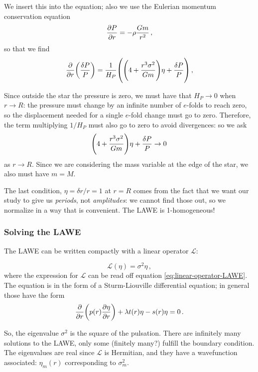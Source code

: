 \documentclass[main.tex]{subfiles}
\begin{document}
We insert this into the equation; also we use the Eulerian momentum conservation equation 
%
\begin{align}
\pdv{P}{r} = -\rho \frac{Gm}{r^2}
\,,
\end{align}
%
so that we find 
%
\begin{align}
\pdv{}{r} \qty(\frac{ \delta P}{P}) =
\frac{1}{H_P} \qty(
\qty(
4 + \frac{r^3 \sigma^2}{ Gm}
) \eta 
+ \frac{ \delta P }{P }
)
\,,
\end{align}
%

Since outside the star the pressure is zero, we must have that \(H_P \rightarrow 0\) when \(r \rightarrow R\): the pressure must change by an infinite number of \(e\)-folds to reach zero, so the displacement needed for a single \(e\)-fold change must go to zero. Therefore, the term multiplying \(1/H_P\) must also go to zero to avoid divergences: so we ask 
%
\begin{align}
\qty(4 + \frac{r^3 \sigma^2 }{Gm}) \eta + \frac{ \delta P}{P} \rightarrow 0 
\,
\end{align}
%
as \(r \rightarrow R\). Since we are considering the mass variable at the edge of the star, we also must have \(m=M\).

The last condition, \(\eta = \delta r / r = 1\) at \(r=R\) comes from the fact that we want our study to give us \emph{periods}, not \emph{amplitudes}: we cannot find those out, so we normalize in a way that is convenient. The LAWE is 1-homogeneous!

\subsubsection{Solving the LAWE}

The LAWE can be written compactly with a linear operator \(\mathcal L\):

\begin{equation}
  \mathcal L (\eta) = \sigma^2 \eta\,,
\end{equation}
%
where the expression for \(\mathcal{L}\) can be read off equation \eqref{eq:linear-operator-LAWE}. The equation is in the form of a Sturm-Liouville differential equation; in general those have the form 
%
\begin{align}
\pdv{}{r} \qty(p(r) \pdv{\eta }{r}) + \lambda t(r) \eta 
- s(r) \eta  = 0 
\,.
\end{align}


So, the eigenvalue \(\sigma^2\) is the square of the pulsation.
There are infinitely many solutions to the LAWE, only some (finitely many?) fulfill the boundary condition.
The eigenvalues are real since \(\mathcal L\) is Hermitian,  and they have a wavefunction associated: \(\eta_m (r)\) corresponding to \(\sigma_m ^2\).
\end{document}
